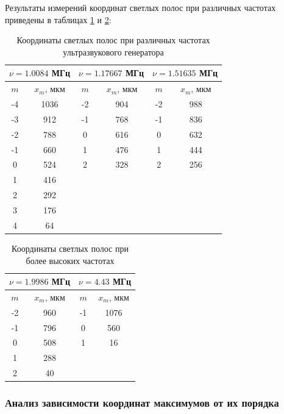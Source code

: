 Результаты измерений координат светлых полос при различных частотах приведены в таблицах \ref{tab:measurements1} и \ref{tab:measurements2}:

\begin{longtable}[c]{|c|c|c|c|c|c|}
\caption{Координаты светлых полос при различных частотах ультразвукового генератора}
\label{tab:measurements1}\\
\hline
\multicolumn{2}{|c|}{$\nu = 1.0084$ МГц} & \multicolumn{2}{c|}{$\nu = 1.17667$ МГц} & \multicolumn{2}{c|}{$\nu = 1.51635$ МГц} \\ \hline
$m$ & $x_m$, мкм & $m$ & $x_m$, мкм & $m$ & $x_m$, мкм \\ \hline
\endfirsthead
%
\endhead
%
-4 & 1036 & -2 & 904 & -2 & 988 \\ \hline
-3 & 912 & -1 & 768 & -1 & 836 \\ \hline
-2 & 788 & 0 & 616 & 0 & 632 \\ \hline
-1 & 660 & 1 & 476 & 1 & 444 \\ \hline
0 & 524 & 2 & 328 & 2 & 256 \\ \hline
1 & 416 & & & & \\ \hline
2 & 292 & & & & \\ \hline
3 & 176 & & & & \\ \hline
4 & 64 & & & & \\ \hline
\end{longtable}

\begin{longtable}[c]{|c|c|c|c|}
\caption{Координаты светлых полос при более высоких частотах}
\label{tab:measurements2}\\
\hline
\multicolumn{2}{|c|}{$\nu = 1.9986$ МГц} & \multicolumn{2}{c|}{$\nu = 4.43$ МГц} \\ \hline
$m$ & $x_m$, мкм & $m$ & $x_m$, мкм \\ \hline
\endfirsthead
%
\endhead
%
-2 & 960 & -1 & 1076 \\ \hline
-1 & 796 & 0 & 560 \\ \hline
0 & 508 & 1 & 16 \\ \hline
1 & 288 & & \\ \hline
2 & 40 & & \\ \hline
\end{longtable}

\subsubsection{Анализ зависимости координат максимумов от их порядка}

